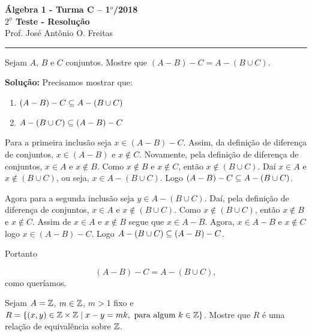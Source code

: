 \documentclass[12pt]{article}
\begin{document}


\begin{center}
{\Large\bf {\'A}lgebra 1 - Turma C -- 1$^{o}$/2018} \\ \vspace{9pt} {\large\bf
  $2^{\underline{o}}$ Teste - Resolu\c{c}\~ao}\\
\vspace{9pt} Prof. Jos{\'e} Ant{\^o}nio O. Freitas
\end{center}
\hrule

\vspace{.6cm}

\questao Sejam $A$, $B$ e $C$ conjuntos. Mostre que $(A - B) - C = A - (B \cup C)$.

\noindent\textbf{Solu\c{c}\~ao:} Precisamos mostrar que:
\begin{enumerate}[label={\roman*})]
	\item $(A - B) - C \subseteq A - (B \cup C)$
	\item $A - (B \cup C) \subseteq (A - B) - C$
\end{enumerate}

Para a primeira inclusão seja $x \in (A - B) - C$. Assim, da definição de diferença de conjuntos, $x \in (A - B)$ e $x \notin C$. Novamente, pela definição de diferença de conjuntos, $x \in A$ e $x \notin B$. Como $x \notin B$ e $x \notin C$, então $x \notin (B \cup C)$. Daí $x \in A$ e $x \notin (B \cup C)$, ou seja, $x \in A - (B \cup C)$. Logo $(A - B) - C \subseteq A - (B \cup C)$.

Agora para a segunda inclusão seja $y \in A - (B \cup C)$. Daí, pela definição de diferença de conjuntos, $x \in A$ e $x \notin (B \cup C)$. Como $x \notin (B \cup C)$, então $x \notin B$ e $x \notin C$. Assim de $x \in A$ e $x \notin B$ segue que $x \in A - B$. Agora, $x \in A - B$ e $x \notin C$ logo $x \in (A - B) - C$. Logo $A - (B \cup C) \subseteq (A - B) - C$.

Portanto

\[
	(A - B) - C = A - (B \cup C),
\]
como queríamos.

\vspace{.5cm}

\questao Sejam $A = \mathbb{Z}$, $m \in \mathbb{Z}$, $m > 1$ fixo e $R = \{(x,y)\in \mathbb{Z} \times \mathbb{Z} \mid x - y = mk, \mbox{ para algum } k \in \mathbb{Z}\}$. Mostre que $R$
é uma rela{\c c}{\~a}o de equival{\^e}ncia sobre $\mathbb{Z}$.
\end{document}
